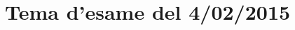 \documentclass[main.tex]{subfiles}
\begin{document}
\section{Tema d'esame del 4/02/2015}


\end{document}
